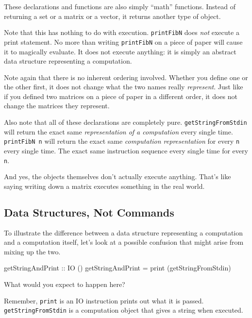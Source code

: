 \documentclass[]{article}
\newenvironment{Shaded}{}{}
\newcommand{\DataTypeTok}[1]{\textcolor[rgb]{0.56,0.13,0.00}{#1}}
\newcommand{\FunctionTok}[1]{\textcolor[rgb]{0.02,0.16,0.49}{#1}}
\newcommand{\NormalTok}[1]{#1}
\newcommand{\OtherTok}[1]{\textcolor[rgb]{0.00,0.44,0.13}{#1}}
\begin{document}
These declarations and functions are also simply ``math'' functions. Instead of
returning a set or a matrix or a vector, it returns another type of object.

Note that this has nothing to do with execution. \texttt{printFibN} does
\emph{not} execute a print statement. No more than writing \texttt{printFibN} on
a piece of paper will cause it to magically evaluate. It does not execute
anything: it is simply an abstract data structure representing a computation.

Note again that there is no inherent ordering involved. Whether you define one
or the other first, it does not change what the two names really
\emph{represent}. Just like if you defined two matrices on a piece of paper in a
different order, it does not change the matrices they represent.

Also note that all of these declarations are completely pure.
\texttt{getStringFromStdin} will return the exact same \emph{representation of a
computation} every single time. \texttt{printFibN\ n} will return the exact same
\emph{computation representation} for every \texttt{n} every single time. The
exact same instruction sequence every single time for every \texttt{n}.

And yes, the objects themselves don't actually execute anything. That's like
saying writing down a matrix executes something in the real world.

\hypertarget{data-structures-not-commands}{%
\subsection{Data Structures, Not Commands}\label{data-structures-not-commands}}

To illustrate the difference between a data structure representing a computation
and a computation itself, let's look at a possible confusion that might arise
from mixing up the two.

\begin{Shaded}
\begin{Highlighting}[]
\OtherTok{getStringAndPrint ::} \DataTypeTok{IO}\NormalTok{ ()}
\NormalTok{getStringAndPrint }\FunctionTok{=}\NormalTok{ print (getStringFromStdin)}
\end{Highlighting}
\end{Shaded}

What would you expect to happen here?

Remember, \texttt{print} is an IO instruction prints out what it is passed.
\texttt{getStringFromStdin} is a computation object that gives a string when
executed.
\end{document}
